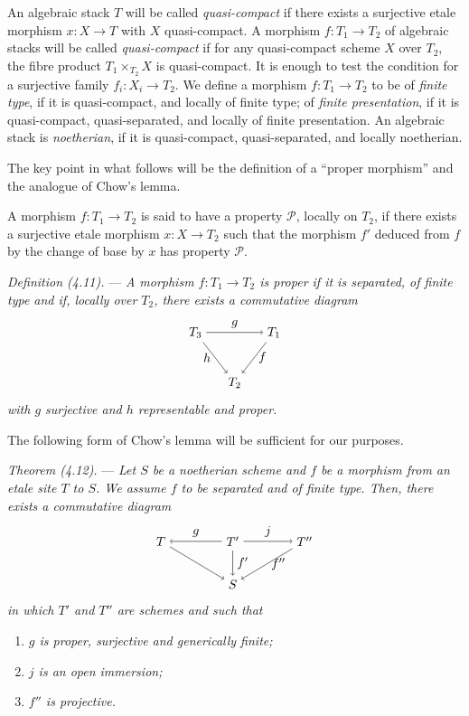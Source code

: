 \documentclass[10pt]{article}
\begin{document}
An algebraic stack $T$ will be called \emph{quasi-compact} if there exists a surjective etale morphism $x:X\to T$ with $X$ quasi-compact. A morphism $f:T_1\to T_2$ of algebraic stacks will be called \emph{quasi-compact} if for any quasi-compact scheme $X$ over $T_2$, the fibre product $T_1\times_{T_2}X$ is quasi-compact. It is enough to test the condition for a surjective family $f_i:X_i\to T_2$. We define a morphism $f:T_1\to T_2$ to be of \emph{finite type}, if it is quasi-compact, and locally of finite type; of \emph{finite presentation}, if it is quasi-compact, quasi-separated, and locally of finite presentation. An algebraic stack is \emph{noetherian}, if it is quasi-compact, quasi-separated, and locally noetherian.

The key point in what follows will be the definition of a ``proper morphism'' and the analogue of Chow's lemma.

A morphism $f:T_1\to T_2$ is said to have a property $\mathcal P$, locally on $T_2$, if there exists a surjective etale morphism $x:X\to T_2$ such that the morphism $f'$ deduced from $f$ by the change of base by $x$ has property $\mathcal P$.

\medskip
\noindent\emph{Definition (4.11).} --- \emph{A morphism $f:T_1\to T_2$ is proper if it is separated, of finite type and if, locally over $T_2$, there exists a commutative diagram}
\[
\begin{tikzpicture}[baseline=(current bounding box.center)]
\node (T3) at (0,1.4) {$T_3$};
\node (T1) at (2.2,1.4) {$T_1$};
\node (T2) at (1.1,0) {$T_2$};
\draw[->] (T3) -- node[above] {$g$} (T1);
\draw[->] (T1) -- node[right] {$f$} (T2);
\draw[->] (T3) -- node[left] {$h$} (T2);
\end{tikzpicture}
\]
\emph{with $g$ surjective and $h$ representable and proper.}

The following form of Chow's lemma will be sufficient for our purposes.

\medskip
\noindent\emph{Theorem (4.12).} --- \emph{Let $S$ be a noetherian scheme and $f$ be a morphism from an etale site $T$ to $S$. We assume $f$ to be separated and of finite type. Then, there exists a commutative diagram}
\[
\begin{tikzpicture}[baseline=(current bounding box.center)]
\node (T) at (0,1.2) {$T$};
\node (Tp) at (2.0,1.2) {$T'$};
\node (Tpp) at (4.0,1.2) {$T''$};
\node (S) at (2.0,0) {$S$};
\draw[->] (Tp) -- node[above] {$g$} (T);
\draw[->] (Tp) -- node[above] {$j$} (Tpp);
\draw[->] (T) -- (S);
\draw[->] (Tp) -- node[right] {$f'$} (S);
\draw[->] (Tpp) -- node[right] {$f''$} (S);
\end{tikzpicture}
\]
\emph{in which $T'$ and $T''$ are schemes and such that}
\begin{enumerate}[label=(\roman*)]
\item \emph{$g$ is proper, surjective and generically finite;}
\item \emph{$j$ is an open immersion;}
\item \emph{$f''$ is projective.}
\end{enumerate}
\end{document}
